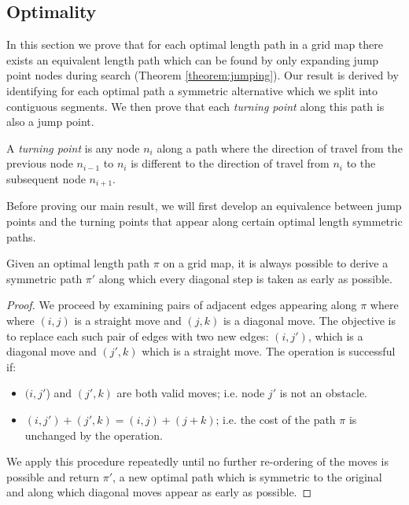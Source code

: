 \subsection{Optimality}
In this section we prove that for each optimal length path in a grid map there
exists an equivalent length path which can be found by only expanding jump
point nodes during search (Theorem \ref{theorem:jumping}).  Our result is
derived by identifying for each optimal path a symmetric alternative which we
split into contiguous segments. We then prove that each \emph{turning point}
along this path is also a jump point.

\begin{definition}
\label{def:turningpoint}
A \emph{turning point} is any node $n_{i}$ along a path where the direction of
travel from the previous node $n_{i-1}$ to $n_{i}$ is different to the direction
of travel from $n_{i}$ to the subsequent node $n_{i+1}$.
\end{definition}

Before proving our main result, we will first develop an equivalence between
jump points and the turning points that appear along certain optimal length 
symmetric paths.
 
\begin{lemma}
\label{lemma:piprime}
Given an optimal length path $\pi$ on a grid map, it is always possible to
derive a symmetric path $\pi'$ along which every diagonal step is taken as
early as possible.
\end{lemma}
\begin{proof}
We proceed by examining pairs of adjacent edges appearing along $\pi$ where
where $(i, j)$ is a straight move and $(j, k)$ is a diagonal move.
The objective is to replace each such pair of edges with two new edges: 
$(i, j')$, which is a diagonal move and $(j', k)$ which is a straight move. 
The operation is successful if:
\begin{itemize}
\item $(i, j'$) and $(j', k)$ are both valid moves; i.e. node $j'$ is not an
obstacle.
\item $(i, j') + (j', k) = (i, j) + (j + k)$; i.e. the cost of
the path $\pi$ is unchanged by the operation.
\end{itemize}
We apply this procedure repeatedly until no further re-ordering of the moves
is possible and return $\pi'$, a new optimal path which is symmetric
to the original and along which diagonal moves appear as early as possible.
\end{proof}

